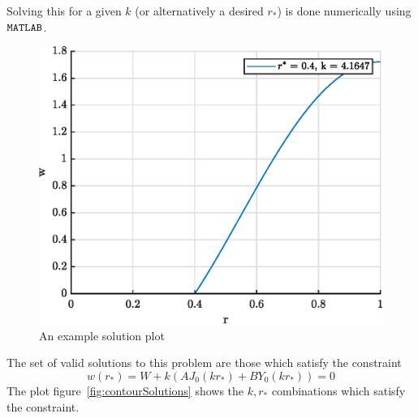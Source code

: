 \documentclass{X:/Documents/Coding/Latex/myreport}
\begin{document}






Solving this for a given $k$ (or alternatively a desired $r_*$) is done numerically using $\verb|MATLAB|$.

\begin{figure}[h]
    \centering
    \includegraphics[width=\linewidth]{exampleKRstar}
    \caption{An example solution plot}
    \label{fig:exampleKRstar}
\end{figure}


The set of valid solutions to this problem are those which satisfy the constraint
\[w(r_*) = W + k(AJ_0(kr_*) + BY_0(kr_*)) = 0\]
The plot figure~\ref{fig:contourSolutions} shows the $k,r_*$ combinations which satisfy the constraint. 
\end{document}

